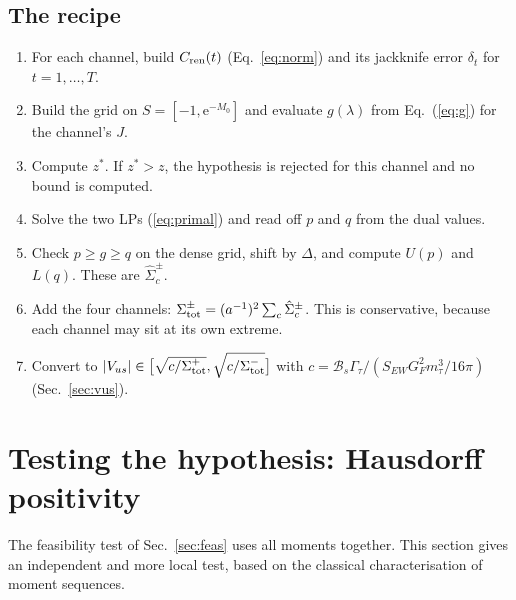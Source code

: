 \documentclass[11pt]{article}
\newcommand{\ee}{\mathrm{e}}
\newcommand{\Vus}{|V_{us}|}
\newcommand{\BR}{\mathcal{B}}
\theoremstyle{remark}
\begin{document}
\subsection{The recipe}\label{sec:recipe}
\begin{enumerate}[leftmargin=*,itemsep=1pt]
\item For each channel, build $C_{\rm ren}(t)$ (Eq.~\ref{eq:norm}) and its jackknife error $\delta_t$ for $t=1,\dots,T$.
\item Build the grid on $S=[-1,\ee^{-M_0}]$ and evaluate $g(\lambda)$ from Eq.~(\ref{eq:g}) for the channel's $J$.
\item Compute $z^*$. If $z^*>z$, the hypothesis is rejected for this channel and no bound is computed.
\item Solve the two LPs (\ref{eq:primal}) and read off $p$ and $q$ from the dual values.
\item Check $p\ge g\ge q$ on the dense grid, shift by $\Delta$, and compute $U(p)$ and $L(q)$. These are $\hat\Sigma^\pm_c$.
\item Add the four channels: $\Sigma^\pm_{\rm tot}=(a^{-1})^2\sum_c\hat\Sigma^\pm_c$. This is conservative, because each channel may sit at its own extreme.
\item Convert to $\Vus\in\big[\sqrt{c/\Sigma^+_{\rm tot}},\sqrt{c/\Sigma^-_{\rm tot}}\big]$ with $c=\BR_s\Gamma_\tau/(S_{EW}G_F^2m_\tau^3/16\pi)$ (Sec.~\ref{sec:vus}).
\end{enumerate}

\section{Testing the hypothesis: Hausdorff positivity}\label{sec:hausdorff}
The feasibility test of Sec.~\ref{sec:feas} uses all moments together. This section gives an independent and more local test, based on the classical characterisation of moment sequences.
\end{document}
